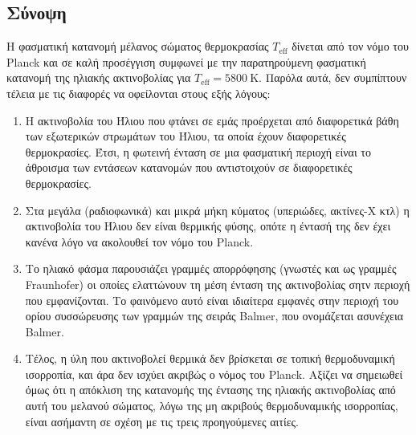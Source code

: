 \subsection{Σύνοψη}
Η φασματική κατανομή μέλανος σώματος θερμοκρασίας $T_{\text{eff}}$ δίνεται από τον νόμο του Planck και σε καλή προσέγγιση συμφωνεί με την παρατηρούμενη φασματική κατανομή της ηλιακής ακτινοβολίας για  $T_{\text{eff}} = 5800 \ \text{K}$. Παρόλα αυτά, δεν συμπίπτουν τέλεια με τις διαφορές να οφείλονται στους εξής λόγους:
\begin{enumerate}
    \item Η ακτινοβολία του Ήλιου που φτάνει σε εμάς προέρχεται από διαφορετικά βάθη των εξωτερικών στρωμάτων του Ήλιου, τα οποία έχουν διαφορετικές θερμοκρασίες. Έτσι, η φωτεινή ένταση σε μια φασματική περιοχή είναι το άθροισμα των εντάσεων κατανομών που αντιστοιχούν σε διαφορετικές θερμοκρασίες.
    \item Στα μεγάλα (ραδιοφωνικά) και μικρά μήκη κύματος (υπεριώδες, ακτίνες-Χ κτλ) η ακτινοβολία του Ήλιου δεν είναι θερμικής φύσης, οπότε η έντασή της δεν έχει κανένα λόγο να ακολουθεί τον νόμο του Planck.
    \item Το ηλιακό φάσμα παρουσιάζει γραμμές απορρόφησης (γνωστές και ως γραμμές Fraunhofer) οι οποίες ελαττώνουν τη μέση ένταση της ακτινοβολίας σητν περιοχή που εμφανίζονται. Το φαινόμενο αυτό είναι ιδιαίτερα εμφανές στην περιοχή του ορίου συσσώρευσης των γραμμών της σειράς Balmer, που ονομάζεται ασυνέχεια Balmer.
    \item Τέλος, η ύλη που ακτινοβολεί θερμικά δεν βρίσκεται σε τοπική θερμοδυναμική ισορροπία, και άρα δεν ισχύει ακριβώς ο νόμος του Planck. Αξίζει να σημειωθεί όμως ότι η απόκλιση της κατανομής της έντασης της ηλιακής ακτινοβολίας από αυτή του μελανού σώματος, λόγω της μη ακριβούς θερμοδυναμικής ισορροπίας, είναι ασήμαντη σε σχέση με τις τρεις προηγούμενες αιτίες.
\end{enumerate}











